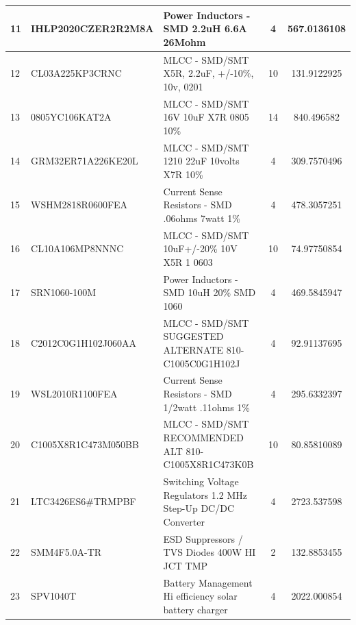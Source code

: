 \begin{table}[ht]
{\begin{tabular}{|cclc|c|}
			\multicolumn{1}{|l|}{11} & \multicolumn{1}{l|}{IHLP2020CZER2R2M8A} & \multicolumn{1}{l|}{Power Inductors - SMD   2.2uH 6.6A 26Mohm} & 4 & 567.0136108 \\ \hline
			\multicolumn{1}{|l|}{12} & \multicolumn{1}{l|}{CL03A225KP3CRNC} & \multicolumn{1}{l|}{MLCC - SMD/SMT X5R,   2.2uF, +/-10\%, 10v, 0201} & 10 & 131.9122925 \\ \hline
			\multicolumn{1}{|l|}{13} & \multicolumn{1}{l|}{0805YC106KAT2A} & \multicolumn{1}{l|}{MLCC - SMD/SMT 16V   10uF X7R 0805 10\%} & 14 & 840.496582 \\ \hline
			\multicolumn{1}{|l|}{14} & \multicolumn{1}{l|}{GRM32ER71A226KE20L} & \multicolumn{1}{l|}{MLCC - SMD/SMT 1210   22uF 10volts X7R 10\%} & 4 & 309.7570496 \\ \hline
			\multicolumn{1}{|l|}{15} & \multicolumn{1}{l|}{WSHM2818R0600FEA} & \multicolumn{1}{l|}{Current Sense   Resistors - SMD .06ohms 7watt 1\%} & 4 & 478.3057251 \\ \hline
			\multicolumn{1}{|l|}{16} & \multicolumn{1}{l|}{CL10A106MP8NNNC} & \multicolumn{1}{l|}{MLCC - SMD/SMT   10uF+/-20\% 10V X5R 1 0603} & 10 & 74.97750854 \\ \hline
			\multicolumn{1}{|l|}{17} & \multicolumn{1}{l|}{SRN1060-100M} & \multicolumn{1}{l|}{Power Inductors - SMD   10uH 20\% SMD 1060} & 4 & 469.5845947 \\ \hline
			\multicolumn{1}{|l|}{18} & \multicolumn{1}{l|}{C2012C0G1H102J060AA} & \multicolumn{1}{l|}{MLCC - SMD/SMT   SUGGESTED ALTERNATE 810-C1005C0G1H102J} & 4 & 92.91137695 \\ \hline
			\multicolumn{1}{|l|}{19} & \multicolumn{1}{l|}{WSL2010R1100FEA} & \multicolumn{1}{l|}{Current Sense   Resistors - SMD 1/2watt .11ohms 1\%} & 4 & 295.6332397 \\ \hline
			\multicolumn{1}{|l|}{20} & \multicolumn{1}{l|}{C1005X8R1C473M050BB} & \multicolumn{1}{l|}{MLCC - SMD/SMT   RECOMMENDED ALT 810-C1005X8R1C473K0B} & 10 & 80.85810089 \\ \hline
			\multicolumn{1}{|l|}{21} & \multicolumn{1}{l|}{LTC3426ES6\#TRMPBF} & \multicolumn{1}{l|}{Switching Voltage   Regulators 1.2 MHz Step-Up DC/DC Converter} & 4 & 2723.537598 \\ \hline
			\multicolumn{1}{|l|}{22} & \multicolumn{1}{l|}{SMM4F5.0A-TR} & \multicolumn{1}{l|}{ESD Suppressors / TVS   Diodes 400W HI JCT TMP} & 2 & 132.8853455 \\ \hline
			\multicolumn{1}{|l|}{23} & \multicolumn{1}{l|}{SPV1040T} & \multicolumn{1}{l|}{Battery Management Hi   efficiency solar battery charger} & 4 & 2022.000854 \\ \hline

\end{tabular}}
\end{table}
